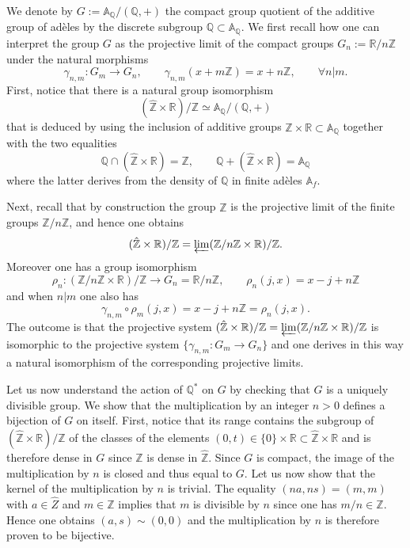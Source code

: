 \documentclass[graybox, envcountsect%
]{svmult}
\def\A{{\mathbb A}}
\def\Q{{\mathbb Q}}
\def\R{{\mathbb R}}
\def\Z{{\mathbb Z}}
\def\no{\noindent}
\begin{document}
\no We denote by $G:=\A_\Q/(\Q,+)$  the compact group quotient of the additive group of  ad\`eles by the discrete subgroup $\Q\subset \A_\Q$. We first recall how one can interpret the group $G$ as the projective limit of the compact groups $G_n:=\R/n\Z$ under the natural morphisms 
\begin{equation}\label{projgn}
  \gamma_{n,m}:G_m\to G_n, \qquad \gamma_{n,m}(x+m\Z)=x+n\Z,\qquad\forall n\vert m.
  \end{equation}
  First, notice that there is a natural group isomorphism 
  $$
  (\hat\Z\times \R)/\Z\simeq \A_\Q/(\Q,+)
  $$
  that is deduced by using the inclusion of  additive groups $\hat\Z\times \R\subset \A_\Q$   together with the two equalities
  $$
  \Q\cap  (\hat\Z\times \R)=\Z, \qquad \Q +  (\hat\Z\times \R)=\A_\Q
  $$
  where the latter derives from the density of $\Q$ in finite ad\`eles $\A_f$. 
  
 \no Next, recall that by construction the group $\hat\Z$ is the projective limit of the finite groups $\Z/n\Z$, and hence one obtains
  $$
   (\hat\Z\times \R)/\Z=\varprojlim (\Z/n\Z\times \R)/\Z.
  $$
 Moreover one has a group isomorphism 
  $$
  \rho_n:(\Z/n\Z\times \R)/\Z\to G_n=\R/n\Z, \qquad \rho_n(j,x)=x-j+n\Z
  $$
  and when $n\vert m$ one also has 
  $$
  \gamma_{n,m}\circ \rho_m(j,x)=x-j+n\Z=\rho_n(j,x).
  $$
  The outcome is that the projective system  $ (\hat\Z\times \R)/\Z=\varprojlim (\Z/n\Z\times \R)/\Z$ is isomorphic to the projective system $\{\gamma_{n,m}:G_m\to G_n\}$ and one derives in this way a natural isomorphism of the corresponding projective limits. \vspace{0.005cm}
    
   Let us now understand the action of $\Q^*$ on $G$ by checking that $G$ is a uniquely divisible group. We show that the multiplication by an integer $n>0$ defines a bijection of $G$ on itself. First, notice that its range contains the subgroup of $(\hat\Z\times \R)/\Z$  of the classes of the elements $(0,t)\in \{0\}\times \R\subset \hat\Z\times \R$ and is therefore dense in $G$ since $\Z$ is dense in $\hat \Z$. Since $G$ is compact, the image of the multiplication by $n$ is  closed and thus equal to $G$. Let us now show that the kernel of the multiplication by $n$ is trivial. The equality $(na,ns)=(m,m)$ with $a\in \hat Z$ and $m\in \Z$ implies that $m$ is divisible by $n$ since one has $m/n\in \hat\Z$. Hence one obtains $(a,s)\sim (0,0)$ and the multiplication by $n$ is therefore proven to be bijective.\vspace{.05in}
   
\end{document}
